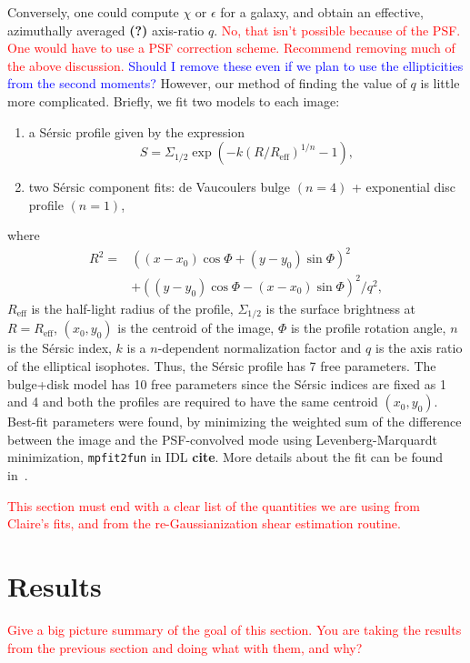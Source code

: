\documentclass[twocolumn,useAMS,usenatbib]{mn2e}
\newcommand{\rachel}[1]{{\textcolor{red}{#1}}}
\newcommand{\arun}[1]{{\textcolor{blue}{#1}}}
\newcommand{\sersic}{S\'{e}rsic }
\begin{document}
Conversely, one could compute $\chi$ or $\epsilon$ for a galaxy, and obtain an effective, azimuthally averaged {\bf(?)} axis-ratio $q$. 
\rachel{No, that isn't possible because of the PSF.  One would have to
  use a PSF correction scheme.  Recommend removing much of the above discussion.}
\arun{Should I remove these even if we plan to use the ellipticities from the second moments?}  
However, our method of finding the value of $q$ is little more complicated. Briefly, we fit
two models to each image:
\begin{enumerate}
 \item a \sersic profile given by the expression 
       \begin{equation} 
    S = \Sigma_{1/2}\exp{\left( -k(R/R_{\text{eff}})^{1/n} -1 \right)},
       \end{equation}
       \item two \sersic component fits: de Vaucoulers bulge $(n=4)$ + exponential disc profile $(n=1)$,
\end{enumerate}
where \begin{align*} R^2 = & ((x-x_0)\cos\Phi+(y-y_0)\sin\Phi)^2  \\ & + ((y-y_0)\cos\Phi-(x-x_0)\sin\Phi)^2/q^2, \end{align*}
$R_{\text{eff}}$ is the half-light radius of the profile, $\Sigma_{1/2}$ is the surface brightness at $R=R_{\text{eff}}$, $(x_0,y_0)$ is the centroid of the image,
$\Phi$ is the profile rotation angle, $n$ is the \sersic index, $k$ is a $n$-dependent normalization factor and $q$ is the axis ratio of the elliptical isophotes.
Thus, the \sersic profile has 7 free parameters. The bulge+disk model has 10 free parameters since the \sersic indices are fixed as 1 and 4
and both the profiles are required to have the same centroid $(x_0,y_0)$. Best-fit parameters were found, by minimizing the weighted
sum of the difference between the image and the PSF-convolved mode
using Levenberg-Marquardt minimization, \texttt{mpfit2fun} in IDL {\bf
  cite}. More details about the fit can be found
in~\cite{Claire_Fits}.

\rachel{This section must end with a clear list of the quantities we
  are using from Claire's fits, and from the re-Gaussianization shear
  estimation routine.}

\section{Results}
\label{S:results}
\rachel{Give a big picture summary of the goal of this section.  You
  are taking the results from the previous section and doing what with
  them, and why?}
\end{document}
